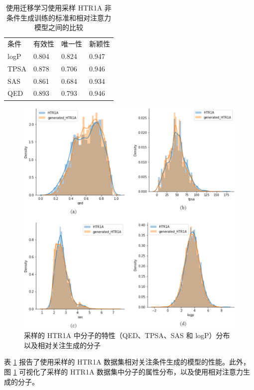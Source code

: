 \begin{translation}
\begin{table}[H]
  \centering
  \caption{使用迁移学习使用采样 HTR1A 非条件生成训练的标准和相对注意力模型之间的比较}
  \label{tab:12}
  \begin{tabular}{llll}
    \hline 条件 & 有效性   & 唯一性   & 新颖性   \\
    logP      & 0.804 & 0.824 & 0.947 \\
    TPSA      & 0.878 & 0.706 & 0.946 \\
    SAS       & 0.861 & 0.684 & 0.934 \\
    QED       & 0.893 & 0.793 & 0.946 \\
    \hline
  \end{tabular}
\end{table}

\begin{figure}[H]
  \centering
  \includegraphics[width=\linewidth]{figures/8.png}
  \caption{采样的 HTR1A 中分子的特性（QED、TPSA、SAS 和 logP）分布以及相对关注生成的分子}
  \label{fig:8}
\end{figure}

表 \ref{tab:12} 报告了使用采样的 HTR1A 数据集相对关注条件生成的模型的性能。此外，图 \ref{fig:8} 可视化了采样的 HTR1A 数据集中分子的属性分布，以及使用相对注意力生成的分子。



\end{translation}

